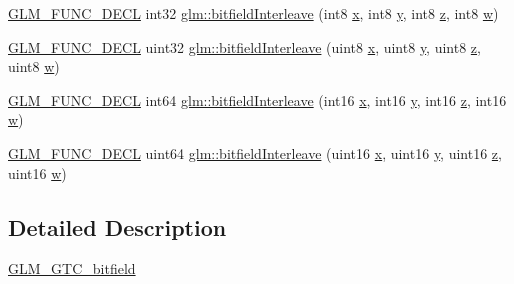 \begin{DoxyCompactItemize}
\item 
\mbox{\hyperlink{setup_8hpp_ab2d052de21a70539923e9bcbf6e83a51}{G\+L\+M\+\_\+\+F\+U\+N\+C\+\_\+\+D\+E\+CL}} int32 \mbox{\hyperlink{group__gtc__bitfield_ga7da84ecc2b3a46c9c08a9f40012359cf}{glm\+::bitfield\+Interleave}} (int8 \mbox{\hyperlink{_s_d_l__opengl_8h_ad0e63d0edcdbd3d79554076bf309fd47}{x}}, int8 \mbox{\hyperlink{_s_d_l__opengl_8h_a1675d9d7bb68e1657ff028643b4037e3}{y}}, int8 \mbox{\hyperlink{_s_d_l__opengl__glext_8h_a5e74030ebb3297ce1b37ff716fedd68f}{z}}, int8 \mbox{\hyperlink{_s_d_l__opengl__glext_8h_a6ee8f168a7ab6785a9bb57c6715dad99}{w}})
\item 
\mbox{\hyperlink{setup_8hpp_ab2d052de21a70539923e9bcbf6e83a51}{G\+L\+M\+\_\+\+F\+U\+N\+C\+\_\+\+D\+E\+CL}} uint32 \mbox{\hyperlink{group__gtc__bitfield_ga447c0bbed9d60c14578626d8f03f3755}{glm\+::bitfield\+Interleave}} (uint8 \mbox{\hyperlink{_s_d_l__opengl_8h_ad0e63d0edcdbd3d79554076bf309fd47}{x}}, uint8 \mbox{\hyperlink{_s_d_l__opengl_8h_a1675d9d7bb68e1657ff028643b4037e3}{y}}, uint8 \mbox{\hyperlink{_s_d_l__opengl__glext_8h_a5e74030ebb3297ce1b37ff716fedd68f}{z}}, uint8 \mbox{\hyperlink{_s_d_l__opengl__glext_8h_a6ee8f168a7ab6785a9bb57c6715dad99}{w}})
\item 
\mbox{\hyperlink{setup_8hpp_ab2d052de21a70539923e9bcbf6e83a51}{G\+L\+M\+\_\+\+F\+U\+N\+C\+\_\+\+D\+E\+CL}} int64 \mbox{\hyperlink{group__gtc__bitfield_ga09ee0be0fac790a1607a711e597dd9bf}{glm\+::bitfield\+Interleave}} (int16 \mbox{\hyperlink{_s_d_l__opengl_8h_ad0e63d0edcdbd3d79554076bf309fd47}{x}}, int16 \mbox{\hyperlink{_s_d_l__opengl_8h_a1675d9d7bb68e1657ff028643b4037e3}{y}}, int16 \mbox{\hyperlink{_s_d_l__opengl__glext_8h_a5e74030ebb3297ce1b37ff716fedd68f}{z}}, int16 \mbox{\hyperlink{_s_d_l__opengl__glext_8h_a6ee8f168a7ab6785a9bb57c6715dad99}{w}})
\item 
\mbox{\hyperlink{setup_8hpp_ab2d052de21a70539923e9bcbf6e83a51}{G\+L\+M\+\_\+\+F\+U\+N\+C\+\_\+\+D\+E\+CL}} uint64 \mbox{\hyperlink{group__gtc__bitfield_gac8a926a7bfd9b23c22a4f685193fbfe1}{glm\+::bitfield\+Interleave}} (uint16 \mbox{\hyperlink{_s_d_l__opengl_8h_ad0e63d0edcdbd3d79554076bf309fd47}{x}}, uint16 \mbox{\hyperlink{_s_d_l__opengl_8h_a1675d9d7bb68e1657ff028643b4037e3}{y}}, uint16 \mbox{\hyperlink{_s_d_l__opengl__glext_8h_a5e74030ebb3297ce1b37ff716fedd68f}{z}}, uint16 \mbox{\hyperlink{_s_d_l__opengl__glext_8h_a6ee8f168a7ab6785a9bb57c6715dad99}{w}})
\end{DoxyCompactItemize}


\subsection{Detailed Description}
\mbox{\hyperlink{group__gtc__bitfield}{G\+L\+M\+\_\+\+G\+T\+C\+\_\+bitfield}} 